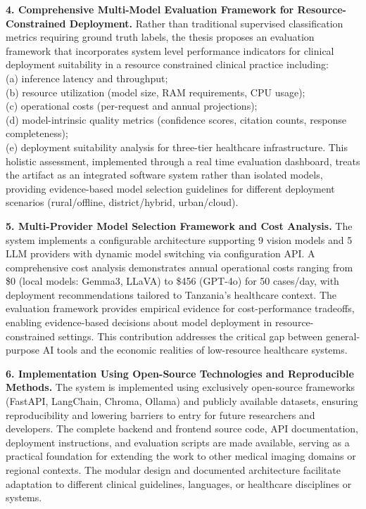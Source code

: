 \documentclass[12pt,a4paper]{report}
\begin{document}
	\textbf{4. Comprehensive Multi-Model Evaluation Framework for Resource-Constrained Deployment.}
	Rather than traditional supervised classification metrics requiring ground truth labels, the thesis proposes an evaluation framework that incorporates system level performance indicators for  clinical deployment suitability in a resource constrained clinical practice including: \\
	(a) inference latency and throughput; \\ 
	(b) resource utilization (model size, RAM requirements, CPU usage); \\
	(c) operational costs (per-request and annual projections); \\
	(d) model-intrinsic quality metrics (confidence scores, citation counts, response completeness); \\
	(e) deployment suitability analysis for three-tier healthcare infrastructure. This holistic assessment, implemented through a real time evaluation dashboard, treats the artifact as an integrated software system rather than isolated models, providing evidence-based model selection guidelines for different deployment scenarios (rural/offline, district/hybrid, urban/cloud).
	
	\textbf{5. Multi-Provider Model Selection Framework and Cost Analysis.}
	The system implements a configurable architecture supporting 9 vision models and 5 LLM providers with dynamic model switching via configuration API. A comprehensive cost analysis demonstrates annual operational costs ranging from \$0 (local models: Gemma3, LLaVA) to \$456 (GPT-4o) for 50 cases/day, with deployment recommendations tailored to Tanzania's healthcare context. The evaluation framework provides empirical evidence for cost-performance tradeoffs, enabling evidence-based decisions about model deployment in resource-constrained settings. This contribution addresses the critical gap between general-purpose AI tools and the economic realities of low-resource healthcare systems.
	
	\textbf{6. Implementation Using Open-Source Technologies and Reproducible Methods.}
	The system is implemented using exclusively open-source frameworks (FastAPI, LangChain, Chroma, Ollama) and publicly available datasets, ensuring reproducibility and lowering barriers to entry for future researchers and developers. The complete backend and frontend source code, API documentation, deployment instructions, and evaluation scripts are made available, serving as a practical foundation for extending the work to other medical imaging domains or regional contexts. The modular design and documented architecture facilitate adaptation to different clinical guidelines, languages, or healthcare disciplines or systems.
	
\end{document}
